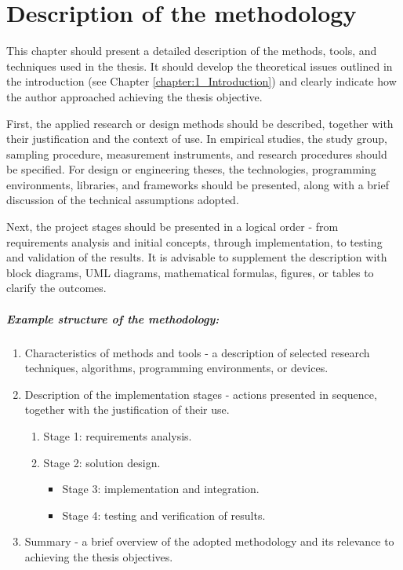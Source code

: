 \chapter[Description of the methodology (Name and surname of the chapter author in the case of a group thesis)]{Description of the methodology}\label{chapter:2_Methodology} 

This chapter should present a detailed description of the methods, tools, and techniques used in the thesis. It should develop the theoretical issues outlined in the introduction (see Chapter \ref{chapter:1_Introduction}) and clearly indicate how the author approached achieving the thesis objective.

First, the applied research or design methods should be described, together with their justification and the context of use. In empirical studies, the study group, sampling procedure, measurement instruments, and research procedures should be specified. For design or engineering theses, the technologies, programming environments, libraries, and frameworks should be presented, along with a brief discussion of the technical assumptions adopted.

Next, the project stages should be presented in a logical order - from requirements analysis and initial concepts, through implementation, to testing and validation of the results. It is advisable to supplement the description with block diagrams, UML diagrams, mathematical formulas, figures, or tables to clarify the outcomes.

\paragraph{Example structure of the methodology:} 
\begin{enumerate}
    \item Characteristics of methods and tools - a description of selected research techniques, algorithms, programming environments, or devices.
    \item Description of the implementation stages - actions presented in sequence, together with the justification of their use.
    \begin{enumerate}[label=\alph*)]
        \item Stage 1: requirements analysis.
        \item Stage 2: solution design.
        \begin{itemize}
            \item Stage 3: implementation and integration.
            \item Stage 4: testing and verification of results.
        \end{itemize}
    \end{enumerate}
    \item Summary - a brief overview of the adopted methodology and its relevance to achieving the thesis objectives.
\end{enumerate}

